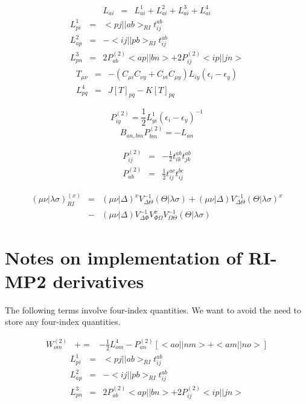 \documentclass[fleqn,12pt]{article}
\newcommand{\half}{\frac{1}{2}}
\newcommand{\bra}{<\!}
\newcommand{\ket}{\!>}
\newcommand{\tijab}{{t_{ij}^{ab}}}
\newcommand{\Ptwo}{P^{(2)}}
\newcommand{\Wtwo}{W^{(2)}}
\newcommand{\intari}[2]{\bra #1 || #2 \ket_{RI}}
\begin{document}
\begin{changebar}
\begin{eqnarray}
  L_{ai} & = & L^1_{ai} + L^2_{ai} + L^3_{ai} + L^4_{ai}
\end{eqnarray}
\begin{eqnarray}
  L^1_{pi} & = & \intari{pj}{ab} \tijab \\
  L^2_{ap} & = & - \intari{ij}{pb} \tijab \\
  L^3_{pn} & = & 2 \Ptwo_{ab} \bra ap || bn \ket + 2 \Ptwo_{ij} \bra ip
  || jn \ket 
\end{eqnarray}
\begin{eqnarray}
  T_{\mu \nu} & = & - \left(C_{\mu i} C_{\nu y} + C_{\nu i} C_{\mu y}
  \right) L_{iy} \left( \epsilon_i - \epsilon_y \right) \\ L^4_{pq} &
  = & J[T]_{pq} - K[T]_{pq}
\end{eqnarray}

\begin{equation}
  \Ptwo_{iy} = \half L^1_{yi} \left( \epsilon_i -  \epsilon_y  \right)^{-1}
\end{equation}
\begin{equation}
  B_{an,bm} \Ptwo_{bm} = -L_{an}
\end{equation}

\begin{eqnarray}
  \Ptwo_{ij} & = & -\half t_{ik}^{ab} t_{jk}^{ab} \\
  \Ptwo_{ab} & = & \half t_{ij}^{ac} t_{ij}^{bc} 
\end{eqnarray}

\begin{eqnarray}
( \mu\nu | \lambda\sigma )^{(x)}_{RI} & = &
   (\mu \nu | \Delta)^{x} V^{-1}_{\Delta\Theta} (\Theta | \lambda \sigma)
   + (\mu \nu | \Delta) V^{-1}_{\Delta\Theta} (\Theta | \lambda \sigma)^{x} \\
 & - & (\mu \nu | \Delta) V^{-1}_{\Delta\Phi} V^{x}_{\Phi\Omega}
             V^{-1}_{\Omega\Theta} (\Theta | \lambda \sigma) \nonumber
\end{eqnarray}

\section{Notes on implementation of RI-MP2 derivatives}

The following terms involve four-index quantities.  We want to avoid
the need to store any four-index quantities.

\begin{eqnarray}
  \Wtwo_{om} & += & -\half L^4_{om}  - \Ptwo_{an} \left[ \bra ao||nm \ket
    + \bra am||no \ket \right]
\end{eqnarray}
\begin{eqnarray}
  L^1_{pi} & = & \intari{pj}{ab} \tijab \\
  L^2_{ap} & = & - \intari{ij}{pb} \tijab \\
  L^3_{pn} & = & 2 \Ptwo_{ab} \bra ap || bn \ket + 2 \Ptwo_{ij} \bra ip
  || jn \ket 
\end{eqnarray}


\end{changebar}
\end{document}
